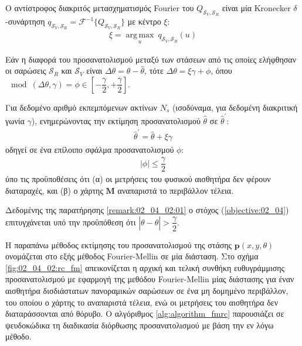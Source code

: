 Ο αντίστροφος διακριτός μετασχηματισμός Fourier του
$Q_{\mathcal{S}_V, \mathcal{S}_R}$ είναι μία Kronecker $\delta$-συνάρτηση
$q_{\mathcal{S}_V, \mathcal{S}_R} = \mathcal{F}^{-1}\{Q_{\mathcal{S}_V, \mathcal{S}_R}\}$
με κέντρο $\xi$:
\begin{align}
  \xi = \operatorname*{arg\,max}\limits_u \ q_{\mathcal{S}_V, \mathcal{S}_R}(u)
\end{align}

Εάν η διαφορά του προσανατολισμού μεταξύ των στάσεων από τις οποίες ελήφθησαν
οι σαρώσεις $\mathcal{S}_R$ και $\mathcal{S}_V$ είναι
$\Delta\theta = \theta - \hat{\theta}$, τότε
$\Delta\theta = \xi\gamma + \phi$, όπου
$\mod(\Delta\theta, \gamma) = \phi \in [-\dfrac{\gamma}{2},+\dfrac{\gamma}{2}]$.

\begin{gg_box}
\begin{remark}
  \label{remark:02_04_02:01}
  Για δεδομένο αριθμό εκπεμπόμενων ακτίνων $N_s$ (ισοδύναμα, για
  δεδομένη διακριτική γωνία $\gamma$), ενημερώνοντας την εκτίμηση
  προσανατολισμού $\hat{\theta}$ σε $\hat{\theta}^\prime$:
  \begin{align}
    \hat{\theta}^\prime = \hat{\theta} + \xi \gamma \label{eq:update_t1}
  \end{align}
  οδηγεί σε ένα επίλοιπο σφάλμα προσανατολισμού $\phi$:
  \begin{align}
    |\phi| \leq \dfrac{\gamma}{2}  \label{eq:phi_1}
  \end{align}
  ύπο τις προϋποθέσεις ότι (α) οι μετρήσεις του φυσικού αισθητήρα δεν φέρουν
  διαταραχές, και (β) ο χάρτης $\bm{M}$ αναπαριστά το περιβάλλον τέλεια.
\end{remark}
\end{gg_box}

\begin{corollary}
  Δεδομένης της παρατήρησης \ref{remark:02_04_02:01} ο στόχος
  (\ref{objective:02_04}) επιτυγχάνεται υπό την προϋπόθεση ότι
  $|\theta-\hat{\theta}| > \dfrac{\gamma}{2}$.
\end{corollary}

Η παραπάνω μέθοδος εκτίμησης του προσανατολισμού της στάσης
$\bm{p}(x,y,\theta)$ ονομάζεται στο εξής μέθοδος Fourier-Mellin σε μία
διάσταση. Στο σχήμα \ref{fig:02_04_02:rc_fm} απεικονίζεται η αρχική και τελική
συνθήκη ευθυγράμμισης προσανατολισμού με εφαρμογή της μεθόδου Fourier-Mellin
μίας διάστασης για έναν αισθητήρα δισδιάστατων πανοραμικών σαρώσεων σε ένα μη
δομημένο περιβάλλον, του οποίου ο χάρτης το αναπαριστά τέλεια, ενώ οι μετρήσεις
του αισθητήρα δεν διαταράσσονται από θόρυβο. Ο αλγόριθμος
\ref{alg:algorithm_fmrc} παρουσιάζει σε ψευδοκώδικα τη διαδικασία διόρθωσης
προσανατολισμού με βάση την εν λόγω μέθοδο.

